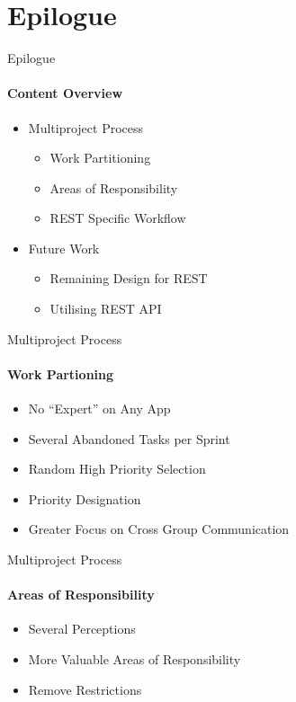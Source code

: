 \section{Epilogue}
    \begin{frame}[t]{Epilogue}\framesubtitle{Content Overview}
        \begin{itemize}
            \item Multiproject Process
            \begin{itemize}
                \item Work Partitioning
                \item Areas of Responsibility
                \item REST Specific Workflow
            \end{itemize}
            \item Future Work
            \begin{itemize}
                \item Remaining Design for REST
                \item Utilising REST API
            \end{itemize}
        \end{itemize}
    \end{frame}

    \begin{frame}[t]{Multiproject Process}\framesubtitle{Work Partioning}  
        \begin{itemize}
            \item No ``Expert'' on Any App
            \item Several Abandoned Tasks per Sprint
            \item Random High Priority Selection
            \item Priority Designation
            \item Greater Focus on Cross Group Communication
        \end{itemize}
    \end{frame}

    \begin{frame}[t]{Multiproject Process}\framesubtitle{Areas of Responsibility}
        \begin{itemize}
            \item Several Perceptions
            \item More Valuable Areas of Responsibility
            \item Remove Restrictions
        \end{itemize}
    \end{frame}

